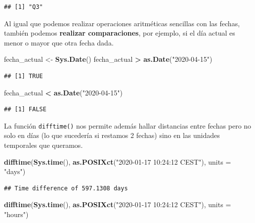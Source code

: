 \documentclass[11pt,]{book}
\newenvironment{Shaded}{\begin{snugshade}}{\end{snugshade}}
\newcommand{\DataTypeTok}[1]{\textcolor[rgb]{0.27,0.27,0.27}{#1}}
\newcommand{\KeywordTok}[1]{\textcolor[rgb]{0.27,0.27,0.27}{\textbf{#1}}}
\newcommand{\NormalTok}[1]{#1}
\newcommand{\OperatorTok}[1]{\textcolor[rgb]{0.43,0.43,0.43}{\textbf{#1}}}
\newcommand{\StringTok}[1]{\textcolor[rgb]{0.5,0.5,0.5}{#1}}
\begin{document}
\begin{verbatim}
## [1] "Q3"
\end{verbatim}

Al igual que podemos realizar operaciones aritméticas sencillas con las fechas, también podemos \textbf{realizar comparaciones}, por ejemplo, si el día actual es menor o mayor que otra fecha dada.

\begin{Shaded}
\begin{Highlighting}[]
\NormalTok{fecha_actual <-}\StringTok{ }\KeywordTok{Sys.Date}\NormalTok{()}
\NormalTok{fecha_actual }\OperatorTok{>}\StringTok{ }\KeywordTok{as.Date}\NormalTok{(}\StringTok{"2020-04-15"}\NormalTok{)}
\end{Highlighting}
\end{Shaded}

\begin{verbatim}
## [1] TRUE
\end{verbatim}

\begin{Shaded}
\begin{Highlighting}[]
\NormalTok{fecha_actual }\OperatorTok{<}\StringTok{ }\KeywordTok{as.Date}\NormalTok{(}\StringTok{"2020-04-15"}\NormalTok{)}
\end{Highlighting}
\end{Shaded}

\begin{verbatim}
## [1] FALSE
\end{verbatim}

La función \texttt{difftime()} nos permite además hallar distancias entre fechas pero no solo en días (lo que sucedería si restamos 2 fechas) sino en las unidades temporales que queramos.

\begin{Shaded}
\begin{Highlighting}[]
\KeywordTok{difftime}\NormalTok{(}\KeywordTok{Sys.time}\NormalTok{(), }\KeywordTok{as.POSIXct}\NormalTok{(}\StringTok{"2020-01-17 10:24:12 CEST"}\NormalTok{), }\DataTypeTok{units =} \StringTok{"days"}\NormalTok{)}
\end{Highlighting}
\end{Shaded}

\begin{verbatim}
## Time difference of 597.1308 days
\end{verbatim}

\begin{Shaded}
\begin{Highlighting}[]
\KeywordTok{difftime}\NormalTok{(}\KeywordTok{Sys.time}\NormalTok{(), }\KeywordTok{as.POSIXct}\NormalTok{(}\StringTok{"2020-01-17 10:24:12 CEST"}\NormalTok{), }\DataTypeTok{units =} \StringTok{"hours"}\NormalTok{)}
\end{Highlighting}
\end{Shaded}
\end{document}
